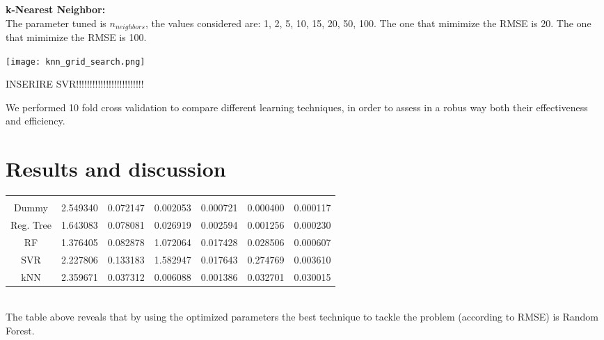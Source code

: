 \documentclass{article}
\begin{document}
\noindent 



\noindent
\begin{minipage}{0.5\textwidth} %
\textbf{k-Nearest Neighbor:} \\ The parameter tuned is $n_{neighbors}$, the values considered are: 1, 2, 5, 10, 15, 20, 50, 100. The one that mimimize the RMSE is 20.
The one that mimimize the RMSE is 100.
\end{minipage} %
\begin{minipage}{0.5\textwidth} %
    \centering
    \texttt{[image: knn\_grid\_search.png]}
\end{minipage}

INSERIRE SVR!!!!!!!!!!!!!!!!!!!!!!!!!



\noindent We performed 10 fold cross validation to compare different learning techniques, in order to assess in a robus way both their effectiveness and efficiency.
\section{Results and discussion}

\begin{tabular}{ccccccc}
\rowcolor{blue!60} \color{white}{Models} & \color{white}{$RMSE_{\mu}$} & \color{white}{$RMSE_{\sigma}$}& \color{white}{$Tlearn_{\mu}$}& \color{white}{$Tlearn_{\sigma}$}& \color{white}{$Tpred_{\mu}$}& \color{white}{$Tpred_{\sigma}$} \\ 
\rowcolor{gray!10} Dummy &2.549340&0.072147&0.002053&0.000721&0.000400&0.000117 \\ 

\rowcolor{white} Reg. Tree&1.643083&0.078081&0.026919&0.002594&0.001256&0.000230\\ 

\rowcolor{gray!10} RF &1.376405&0.082878&1.072064&0.017428&0.028506&0.000607\\ 

\rowcolor{white} SVR & 2.227806&0.133183&1.582947&0.017643&0.274769&0.003610\\ 
\rowcolor{gray!10} kNN &2.359671&0.037312&0.006088&0.001386&0.032701&0.030015\\
\end{tabular}\\[0.5cm]

The table above reveals that by using the optimized parameters the best technique to tackle the problem (according to RMSE) is Random Forest. 
\end{document}
